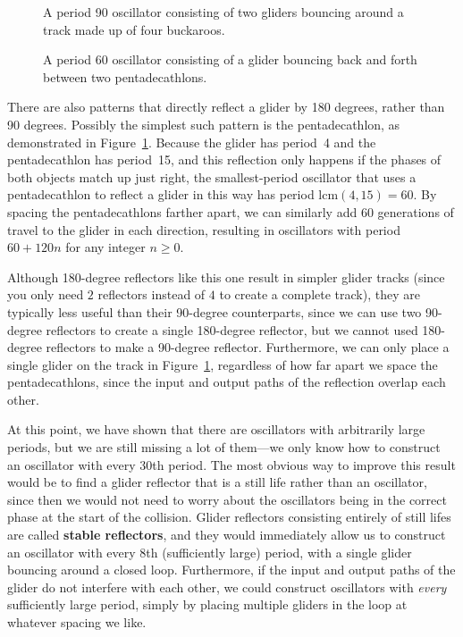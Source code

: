 \begin{figure}[!htb]
	\centering
	\begin{minipage}[b]{.45\textwidth}
		\centering{}
		\caption{A period 90 oscillator consisting of two gliders bouncing around a track made up of four buckaroos.}\label{fig:buckaroo_loop}
	\end{minipage} \hfill %
	\begin{minipage}[b]{.51\textwidth}
		\centering{}
		\caption{A period 60 oscillator consisting of a glider bouncing back and forth between two pentadecathlons.}\label{fig:relay}
	\end{minipage}
\end{figure}

There are also patterns that directly reflect a glider by 180 degrees, rather than 90 degrees. Possibly the simplest such pattern is the pentadecathlon, as demonstrated in Figure~\ref{fig:relay}. Because the glider has period~4 and the pentadecathlon has period~15, and this reflection only happens if the phases of both objects match up just right, the smallest-period oscillator that uses a pentadecathlon to reflect a glider in this way has period $\mathrm{lcm}(4,15) = 60$. By spacing the pentadecathlons farther apart, we can similarly add 60 generations of travel to the glider in each direction, resulting in oscillators with period $60 + 120n$ for any integer $n \geq 0$.

Although 180-degree reflectors like this one result in simpler glider tracks (since you only need $2$ reflectors instead of $4$ to create a complete track), they are typically less useful than their 90-degree counterparts, since we can use two 90-degree reflectors to create a single 180-degree reflector, but we cannot used 180-degree reflectors to make a 90-degree reflector. Furthermore, we can only place a single glider on the track in Figure~\ref{fig:relay}, regardless of how far apart we space the pentadecathlons, since the input and output paths of the reflection overlap each other.

At this point, we have shown that there are oscillators with arbitrarily large periods, but we are still missing a lot of them---we only know how to construct an oscillator with every 30th period. The most obvious way to improve this result would be to find a glider reflector that is a still life rather than an oscillator, since then we would not need to worry about the oscillators being in the correct phase at the start of the collision. Glider reflectors consisting entirely of still lifes are called \textbf{stable reflectors}, and they would immediately allow us to construct an oscillator with every 8th (sufficiently large) period, with a single glider bouncing around a closed loop. Furthermore, if the input and output paths of the glider do not interfere with each other, we could construct oscillators with \emph{every} sufficiently large period, simply by placing multiple gliders in the loop at whatever spacing we like.

